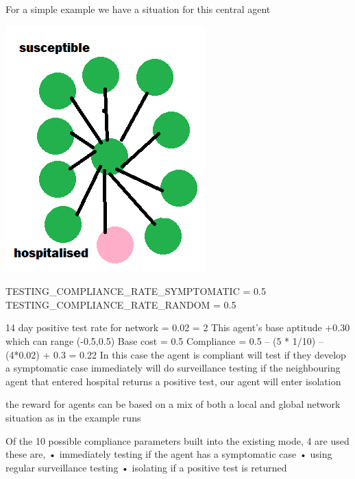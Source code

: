 \documentclass{article}
\begin{document}
For a simple example we have a situation for this central agent 

\includegraphics[width=\textwidth]{basicnet}

TESTING\_COMPLIANCE\_RATE\_SYMPTOMATIC                  = 0.5
TESTING\_COMPLIANCE\_RATE\_RANDOM                       = 0.5

14 day positive test rate for network = 0.02 = 2%
This agent’s base aptitude +0.30 which can range (-0.5,0.5)
Base cost = 0.5
Compliance = 0.5 – (5 * 1/10) – (4*0.02) + 0.3 = 0.22
In this case the agent is compliant
will test if they develop a symptomatic case immediately
will do surveillance testing 
if the neighbouring agent that entered hospital returns a positive test, our agent will enter isolation

the reward for agents can be based on a mix of both a local and global network situation as in the example runs

Of the 10 possible compliance parameters built into the existing mode, 4 are used these are,
•	immediately testing if the agent has a symptomatic case
•	using regular surveillance testing
•	isolating if a positive test is returned
\end{document}
